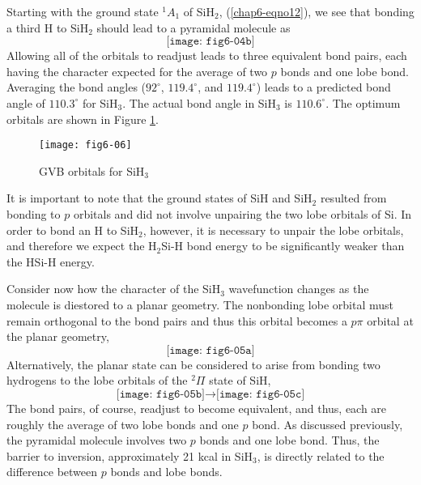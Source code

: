 Starting with the ground state ${^1A}_1$ of SiH$_2$,
(\ref{chap6-eqno12}), we see that bonding a third H to SiH$_2$ should
lead to a pyramidal molecule as
\begin{equation}
\texttt{[image: fig6-04b]}
\label{chap6-eqno15}
\end{equation}
Allowing all of the orbitals to readjust leads to three equivalent
bond pairs, each having the character expected for the average of two
$p$ bonds and one lobe bond. Averaging the bond angles ($92^\circ$, 
$119.4^\circ$, and $119.4^\circ$) leads to a predicted bond angle of 
$110.3^\circ$ for SiH$_3$. The actual bond angle in SiH$_3$ is
$110.6^\circ$.  The optimum orbitals are shown in Figure
\ref{chap6-fig5-2}. 

\begin{figure}
\texttt{[image: fig6-06]}
\caption{GVB orbitals for SiH$_3$}
\label{chap6-fig5-2}
\end{figure}

It is important to note that the ground states of SiH and SiH$_2$
resulted from bonding to $p$ orbitals and did not involve unpairing
the two lobe orbitals of Si. In order to bond an H to SiH$_2$,
however, it is necessary to unpair the lobe orbitals, and therefore we
expect the H$_2$Si-H bond energy to be significantly weaker than the
HSi-H energy.

Consider now how the character of the SiH$_3$ wavefunction changes as
the molecule is diestored to a planar geometry. The nonbonding lobe
orbital must remain orthogonal to the bond pairs and thus this orbital
becomes a $p\pi$ orbital at the planar geometry,
\begin{equation}
\texttt{[image: fig6-05a]}
\label{chap6-eqno15-2}
\end{equation}
Alternatively, the planar state can be considered to arise from
bonding two hydrogens to the lobe orbitals of the $^2\Pi$ state of
SiH, 
\begin{equation}
\texttt{[image: fig6-05b]}
\rightarrow
\texttt{[image: fig6-05c]}
\label{chap6-eqno15-3}
\end{equation}
The bond pairs, of course, readjust to become equivalent, and thus, 
each are roughly the average of two lobe bonds and one $p$ bond.  As 
discussed previously, the pyramidal molecule involves two $p$ bonds 
and one lobe bond.  Thus, the barrier to inversion, approximately 21 
kcal in SiH$_3$, is directly related to the difference between $p$ 
bonds and lobe bonds.

